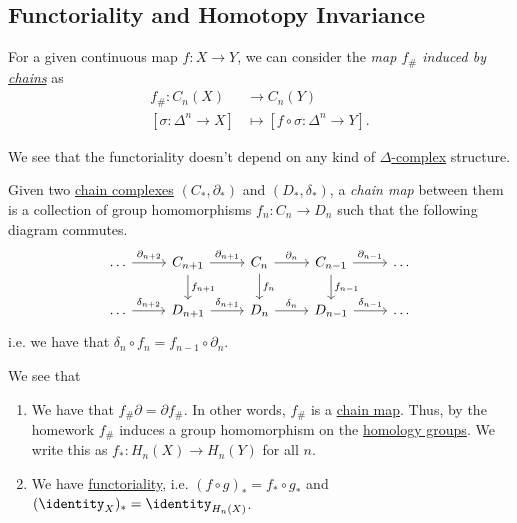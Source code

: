 \subsection{Functoriality and Homotopy Invariance}
\begin{definition}\label{def:induced-map-on-chains}
	For a given continuous map \(f \colon X \to Y\), we can consider the \emph{map \(f_{\#}\) induced by \hyperref[def:chain-complex]{chains}} as
	\[
		\begin{split}
			f_{\#} \colon C_n(X)           & \to C_n(Y)                                      \\
			[\sigma \colon \Delta^n \to X] & \mapsto [f \circ \sigma \colon \Delta^n \to Y].
		\end{split}
	\]
\end{definition}
\begin{remark}
	We see that the functoriality doesn't depend on any kind of \hyperref[def:delta-complex]{\(\Delta \)-complex} structure.
\end{remark}

\begin{definition}\label{def:chain-map}
	Given two \hyperref[def:chain-complex]{chain complexes} \((C_\ast, \partial_\ast)\) and \((D_\ast, \delta_\ast)\), a
	\emph{chain map} between them is a collection of group homomorphisms \(f_n \colon C_n \to D_n\) such that the following diagram commutes.
	\[\begin{tikzcd}
			\ldots & {C_{n+1}} & {C_n} & {C_{n-1}} & \ldots \\
			\ldots & {D_{n+1}} & {D_n} & {D_{n-1}} & \ldots
			\arrow["{\partial_{n+2}}", from=1-1, to=1-2]
			\arrow["{\delta_{n+2}}", from=2-1, to=2-2]
			\arrow["{\delta_{n+1}}", from=2-2, to=2-3]
			\arrow["{\delta_{n}}", from=2-3, to=2-4]
			\arrow["{\partial_{n-1}}", from=1-4, to=1-5]
			\arrow["{\partial_{n}}", from=1-3, to=1-4]
			\arrow["{\partial_{n+1}}", from=1-2, to=1-3]
			\arrow["{\delta_{n-1}}", from=2-4, to=2-5]
			\arrow["{f_{n-1}}", from=1-4, to=2-4]
			\arrow["{f_{n}}", from=1-3, to=2-3]
			\arrow["{f_{n+1}}", from=1-2, to=2-2]
		\end{tikzcd}\]
	i.e. we have that \(\delta_n \circ f_n = f_{n - 1} \circ \partial_n\).
\end{definition}

\begin{exercise}
	We see that
	\begin{enumerate}
		\item We have that \(f_{\#} \partial = \partial f_{\#}\). In other words, \(f_{\#}\) is a \hyperref[def:chain-map]{chain map}.
		      Thus, by the homework \(f_{\#}\) induces a group homomorphism on the \hyperref[def:homology-group]{homology groups}. We write
		      this as \(f_\ast \colon H_n(X) \to H_n(Y)\) for all \(n\).
		\item We have \underline{functoriality}, i.e. \((f \circ g)_\ast = f_\ast \circ g_\ast\) and \((\identity_X)_\ast = \identity_{H_n(X)}\).
	\end{enumerate}
\end{exercise}

